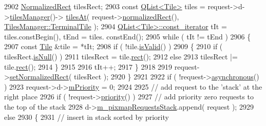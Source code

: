 \begin{DoxyCode}
2902             \hyperlink{classOkular_1_1NormalizedRect}{NormalizedRect} tilesRect;
2903             \textcolor{keyword}{const} \hyperlink{classQList}{QList<Tile>} tiles = request->d->\hyperlink{classOkular_1_1PixmapRequestPrivate_a1765ff434c6bd718628d02bbca3cb271}{tilesManager}()->
      \hyperlink{classOkular_1_1TilesManager_a11cc64225aa62df9d25e294ce71e4dcf}{tilesAt}( request->\hyperlink{classOkular_1_1PixmapRequest_ab867bc095f18ece11fb14ac0201a227d}{normalizedRect}(), 
      \hyperlink{classOkular_1_1TilesManager_a89f92ae8fdfb530b5625343876f63e29a24b2eb2966bd8c2768047de2d1048d2d}{TilesManager::TerminalTile} );
2904             \hyperlink{classQList}{QList<Tile>::const\_iterator} tIt = tiles.constBegin(), tEnd = tiles.
      constEnd();
2905             \textcolor{keywordflow}{while} ( tIt != tEnd )
2906             \{
2907                 \textcolor{keyword}{const} \hyperlink{classOkular_1_1Tile}{Tile} &tile = *tIt;
2908                 \textcolor{keywordflow}{if} ( !tile.\hyperlink{classOkular_1_1Tile_a45926c52fd6e31590fb2c7b293d3b59f}{isValid}() )
2909                 \{
2910                     \textcolor{keywordflow}{if} ( tilesRect.\hyperlink{classOkular_1_1NormalizedRect_a8f9a332a6247f4716d23513af00ac045}{isNull}() )
2911                         tilesRect = tile.\hyperlink{classOkular_1_1Tile_af98992ebbaa390a12a942bff6c246fca}{rect}();
2912                     \textcolor{keywordflow}{else}
2913                         tilesRect |= tile.\hyperlink{classOkular_1_1Tile_af98992ebbaa390a12a942bff6c246fca}{rect}();
2914                 \}
2915 
2916                 tIt++;
2917             \}
2918 
2919             request->\hyperlink{classOkular_1_1PixmapRequest_ada39238e8f4748b0c65dd97a3abcda77}{setNormalizedRect}( tilesRect );
2920         \}
2921 
2922         \textcolor{keywordflow}{if} ( !request->\hyperlink{classOkular_1_1PixmapRequest_a11fee76ef3da1589a28d455519c946a7}{asynchronous}() )
2923             request->d->\hyperlink{classOkular_1_1PixmapRequestPrivate_a9d9712057a03c6148d820d57b6840d4a}{mPriority} = 0;
2924 
2925         \textcolor{comment}{// add request to the 'stack' at the right place}
2926         if ( !request->\hyperlink{classOkular_1_1PixmapRequest_ae6ea9158b7d643d3ace82da2e7231473}{priority}() )
2927             \textcolor{comment}{// add priority zero requests to the top of the stack}
2928             d->\hyperlink{classOkular_1_1DocumentPrivate_af903e531960617af53b4bc79b3a95efa}{m\_pixmapRequestsStack}.append( request );
2929         \textcolor{keywordflow}{else}
2930         \{
2931             \textcolor{comment}{// insert in stack sorted by priority}

\end{DoxyCode}
